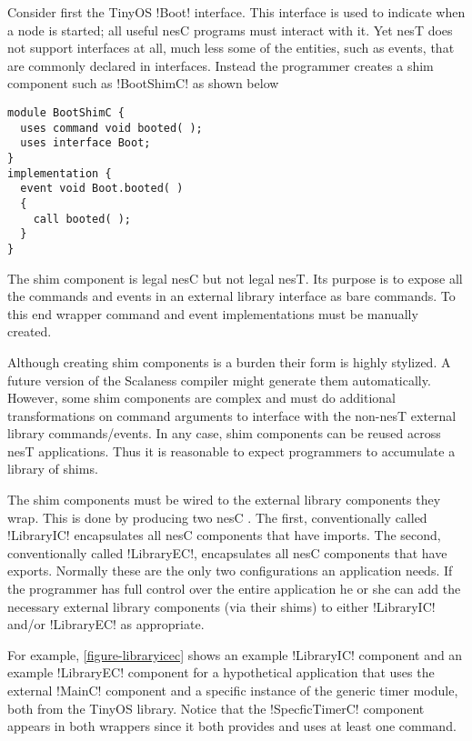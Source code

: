 Consider first the TinyOS !Boot! interface. This interface is used to indicate when a node is
started; all useful nesC programs must interact with it. Yet nesT does not support interfaces at
all, much less some of the entities, such as events, that are commonly declared in interfaces.
Instead the programmer creates a shim component such as !BootShimC! as shown below

\singlespace
\vspace{1.0ex}
\begin{lstlisting}[language=nesC]
module BootShimC {
  uses command void booted( );
  uses interface Boot;
}
implementation {
  event void Boot.booted( )
  {
    call booted( );
  }
}
\end{lstlisting}
\vspace{1.0ex}
\primaryspacing

The shim component is legal nesC but not legal nesT. Its purpose is to expose all the commands
and events in an external library interface as bare commands. To this end wrapper command and
event implementations must be manually created.

Although creating shim components is a burden their form is highly stylized. A future version of
the Scalaness compiler might generate them automatically. However, some shim components are
complex and must do additional transformations on command arguments to interface with the
non-nesT external library commands/events. In any case, shim components can be reused across
nesT applications. Thus it is reasonable to expect programmers to accumulate a library of shims.

The shim components must be wired to the external library components they wrap. This is done by
producing two nesC . The first, conventionally called
!LibraryIC! encapsulates all nesC components that have imports. The second, conventionally
called !LibraryEC!, encapsulates all nesC components that have exports. Normally these are the
only two configurations an application needs. If the programmer has full control over the entire
application he or she can add the necessary external library components (via their shims) to
either !LibraryIC! and/or !LibraryEC! as appropriate.

For example, \autoref{figure-libraryicec} shows an example !LibraryIC! component and an example
!LibraryEC! component for a hypothetical application that uses the external !MainC! component
and a specific instance of the generic timer module, both from the TinyOS library. Notice that
the !SpecficTimerC! component appears in both wrappers since it both provides and uses at least
one command.

